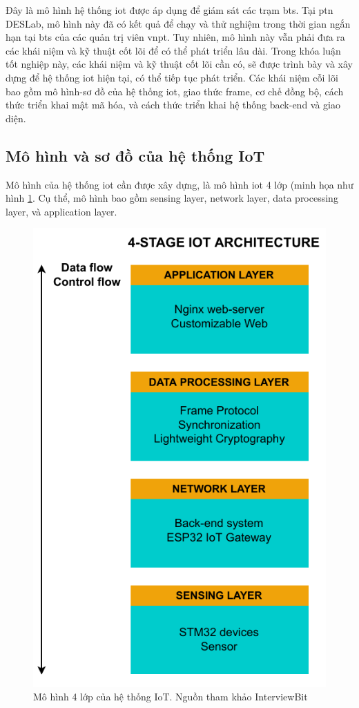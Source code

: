 Đây là mô hình hệ thống \acrshort{iot} được áp dụng để giám sát các trạm \acrshort{bts}. Tại \acrshort{ptn} DESLab, mô hình này đã có kết quả để chạy và thử nghiệm trong thời gian ngắn hạn tại \acrshort{bts} của các quản trị viên \acrshort{vnpt}. Tuy nhiên, mô hình này vẫn phải đưa ra các khái niệm và kỹ thuật cốt lõi để có thể phát triển lâu dài. Trong khóa luận tốt nghiệp này, các khái niệm và kỹ thuật cốt lõi cần có, sẽ được trình bày và xây dựng để hệ thống \acrshort{iot} hiện tại, có thể tiếp tục phát triển. Các khái niệm cỗi lõi bao gồm mô hình-sơ đồ của hệ thống \acrshort{iot}, giao thức frame, cơ chế đồng bộ, cách thức triển khai mật mã hóa, và cách thức triển khai hệ thống back-end và giao diện.

\subsection{Mô hình và sơ đồ của hệ thống IoT}
\label{Model-Diagram-IoT-System}

Mô hình của hệ thống \acrshort{iot} cần được xây dựng, là mô hình \acrshort{iot} 4 lớp (minh họa như hình \ref{fig:IoT-4-Layer-Archi-C2}. Cụ thể, mô hình bao gồm sensing layer, network layer, data processing layer, và application layer.

\begin{figure}[htp]
\centering
\includegraphics[width=8 cm]{images/Thesis-Page-2-IoT-Archi.pdf}
\caption{Mô hình 4 lớp của hệ thống IoT. Nguồn tham khảo InterviewBit~\cite{IoT-4-Layer-Archi}}
\label{fig:IoT-4-Layer-Archi-C2}
\end{figure}

